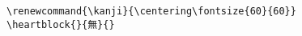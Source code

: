 \documentclass[letterpaper]{article}
\begin{document}
\vspace*{0.5cm}
\begin{multicols}{4}
	\RLmulticolcolumns
	
	\columnbreak
	
	
	\columnbreak
	
	
	\columnbreak
	
	
\end{multicols}

\begin{verbatim}
\renewcommand{\kanji}{\centering\fontsize{60}{60}}
\heartblock{}{無}{}
\end{verbatim}

\vfill\eject\pagebreak


\vspace*{1cm}

\renewcommand{\kanji}{\centering\fontsize{55}{55}}
\vspace*{2cm}

\begin{multicols}{4}
	\RLmulticolcolumns
	
	\columnbreak
		
	\columnbreak

	\columnbreak
	

\end{multicols}
\end{document}
